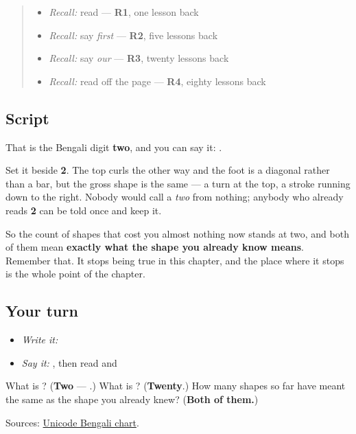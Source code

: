 \label{lesson:BN-W07-digit-two}



\begin{quote}
\begin{itemize}
\raggedright
  \item \emph{Recall:} read \textbf{} — \textbf{R1}, one lesson back
  \item \emph{Recall:} say \emph{first} — \textbf{R2}, five lessons back
  \item \emph{Recall:} say \emph{our} — \textbf{R3}, twenty lessons back
  \item \emph{Recall:} read \textbf{} off the page — \textbf{R4}, eighty lessons back
\end{itemize}
\end{quote}

\subsection*{Script}
\begin{quote}
\end{quote}

That is the Bengali digit \textbf{two}, and you can say it: \textbf{}.

Set it beside \textbf{2}. The top curls the other way and the foot is a diagonal rather than a bar, but the gross shape is the same — a turn at the top, a stroke running down to the right. Nobody would call \textbf{} a \emph{two} from nothing; anybody who already reads \textbf{2} can be told once and keep it.

So the count of shapes that cost you almost nothing now stands at two, and both of them mean \textbf{exactly what the shape you already know means}. Remember that. It stops being true in this chapter, and the place where it stops is the whole point of the chapter.

\subsection*{Your turn}
\begin{itemize}
\raggedright
  \item \emph{Write it:} 
  \item \emph{Say it:} \textbf{}, then read \textbf{} and \textbf{}
\end{itemize}

\begin{tcolorbox}[breakable,colback=teal!4,colframe=teal!35!black,title={Before you move on}]
What is \textbf{}? (\textbf{Two} — \textbf{}.) What is \textbf{}? (\textbf{Twenty}.) How many shapes so far have meant the same as the shape you already knew? (\textbf{Both of them.})

Sources: \href{https://www.unicode.org/charts/PDF/U0980.pdf}{Unicode Bengali chart}.
\end{tcolorbox}
